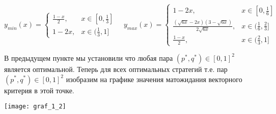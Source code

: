 $$y_{min}(x)=
\begin{cases}
\frac{1-x}{2}, &x\in[0,\frac{1}{3}] \\
1-2x, &x\in(\frac{1}{3},1]
\end{cases}
\quad
y_{max}(x)=
\begin{cases}
1-2x, &x\in[0,\frac{1}{6}] \\
\frac{(\sqrt{6x} - 2x)(3-\sqrt{6x})}{2\sqrt{6x}}, &x\in(\frac{1}{6},\frac{2}{3}]\\
\frac{1-x}{2}, &x\in(\frac{2}{3},1]
\end{cases}
$$

В предыдущем пункте мы установили что любая пара $(p^{*}, q^{*}) \in [0, 1]^{2}$ является оптимальной. Теперь для всех
оптимальных стратегий т.е. пар $(p^{*}, q^{*}) \in [0, 1]^{2}$ изобразим на графике значения матожидания векторного критерия в этой
точке.
\begin{center}
\texttt{[image: graf\_1\_2]}
\end{center}

